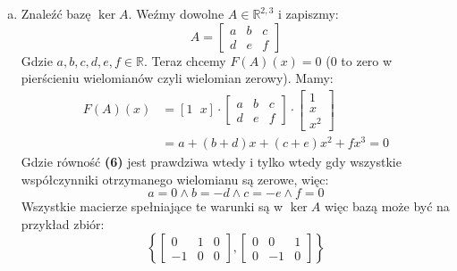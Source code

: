 \documentclass[10pt]{article}
\newcommand{\R}{\mathbb{R}}
\begin{document}
\begin{enumerate}[(a)]
    \item Znaleźć bazę $\ker A$. Weźmy dowolne $A \in \R^{2,3}$ i zapiszmy:
    $$A = \begin{bmatrix}
        a & b & c \\
        d & e & f
    \end{bmatrix}$$
    Gdzie $a, b, c, d, e, f \in \R$. Teraz chcemy $F(A)(x) = 0$ (0 to zero w pierścieniu wielomianów czyli wielomian zerowy). Mamy:
    \begin{align}
        F(A)(x) &= [1 \hspace{7pt} x] \cdot \begin{bmatrix}
        a & b & c \\
        d & e & f
    \end{bmatrix} \cdot \begin{bmatrix}
    1 \\
    x \\
    x^2
    \end{bmatrix} \\
    &= a + (b+d)x + (c+e)x^2 + fx^3 = 0
    \end{align}
    Gdzie równość \textbf{(6)} jest prawdziwa wtedy i tylko wtedy gdy wszystkie współczynniki otrzymanego wielomianu są zerowe, więc:
    $$a = 0 \land b = -d \land c = -e \land f = 0$$
    Wszystkie macierze spełniające te warunki są w $\ker A$ więc bazą może być na przykład zbiór:
    $$\left\{ \begin{bmatrix}
        0 & 1 & 0 \\
        -1 & 0 & 0
    \end{bmatrix}, \begin{bmatrix}
        0 & 0 & 1 \\
        0 & -1 & 0
    \end{bmatrix} \right\}$$
    

\end{enumerate}
\end{document}
